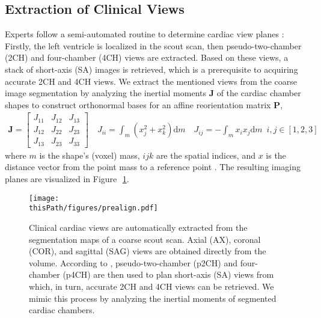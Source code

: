     \subsection{Extraction of Clinical Views}
    \label{sec:view_extraction}
    Experts follow a semi-automated routine to determine cardiac view planes \cite{herzog2017cardiovascular}: Firstly, the left ventricle is localized in the scout scan, then pseudo-two-chamber (2CH) and four-chamber (4CH) views are extracted. Based on these views, a stack of short-axis (SA) images is retrieved, which is a prerequisite to acquiring accurate 2CH and 4CH views.
   We extract the mentioned views from the coarse image segmentation by analyzing the inertial moments $\mathbf{J}$
   of the cardiac chamber shapes to construct orthonormal bases for an affine reorientation matrix $\mathbf{P}$,
    \begin{align}
        \mathbf{J} = \begin{bmatrix}
            J_{11} & J_{12} & J_{13}\\
            J_{12} & J_{22} & J_{23}\\
            J_{13} & J_{23} & J_{33}
            \end{bmatrix} \quad  J_{ii}= \int_{m} \left(x_j^2 + x_k^2\right) \text{d}m \quad J_{ij} = -\int_{m} x_i x_j \text{d}m \enspace i,j \in \left[1,2,3\right]
        \label{eq:inertia}
    \end{align}
    where $m$ is the shape's (voxel) mass, $ijk$ are the spatial indices, and $x$ is the distance vector from the point mass to a reference point \cite{czichos2012huette}. The resulting imaging planes are visualized in Figure~\,\ref{fig:prealign}.

    \begin{figure}
        \texttt{[image: \\thisPath/figures/prealign.pdf]}
        \caption{Clinical cardiac views are automatically extracted from the segmentation maps of a coarse scout scan. Axial (AX), coronal (COR), and sagittal (SAG) views are obtained directly from the volume. According to \cite{herzog2017cardiovascular}, pseudo-two-chamber (p2CH) and four-chamber (p4CH) are then used to plan short-axis (SA) views from which, in turn, accurate 2CH and 4CH views can be retrieved. We mimic this process by analyzing the inertial moments of segmented cardiac chambers.}
        \label{fig:prealign}
    \end{figure}



